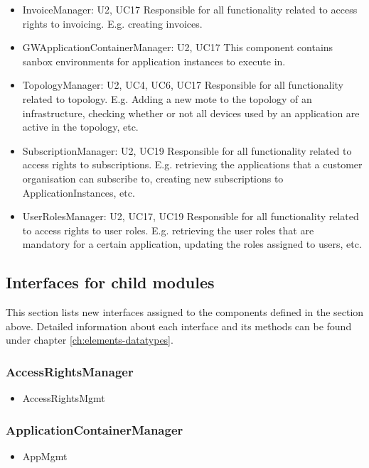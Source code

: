 {{{\begin{itemize}
            organisations that they are associated to, etc.
        \item InvoiceManager: U2, UC17
            Responsible for all functionality related to access rights to invoicing.
            E.g. creating invoices.
        \item GWApplicationContainerManager: U2, UC17
            This component contains sanbox environments for application instances to execute in.
        \item TopologyManager: U2, UC4, UC6, UC17
              Responsible for all functionality related to topology. E.g. Adding a new
              mote to the topology of an infrastructure, checking whether or not all
              devices used by an application are active in the topology, etc.
        \item SubscriptionManager: U2, UC19
              Responsible for all functionality related to access rights to subscriptions.
              E.g. retrieving the applications that a customer organisation can subscribe to,
              creating new subscriptions to ApplicationInstances, etc.
        \item UserRolesManager: U2, UC17, UC19
              Responsible for all functionality related to access rights to user roles.
              E.g. retrieving the user roles that are mandatory for a certain application,
              updating the roles assigned to users, etc.
    \end{itemize}


\subsection{Interfaces for child modules}
    This section lists new interfaces assigned to the components defined
    in the section above. Detailed information about each interface and
    its methods can be found under chapter \ref{ch:elements-datatypes}. \\

    \subsubsection{AccessRightsManager}
        \begin{itemize}
            \item AccessRightsMgmt
        \end{itemize}

    \subsubsection{ApplicationContainerManager}
        \begin{itemize}
            \item AppMgmt
        \end{itemize}

}}}
